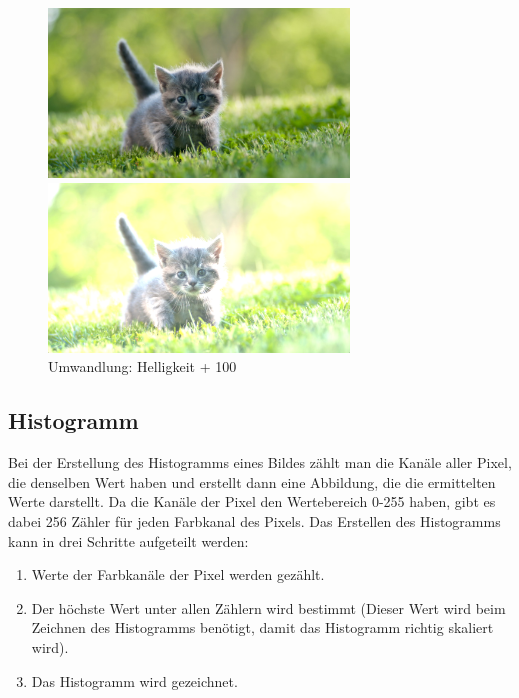 \documentclass[11pt]{amsart}
\begin{document}
\newpage
\begin{figure}[thb!]
\begin{minipage}{8cm}
\includegraphics[width=8cm]{images/original.jpg}
\end{minipage}
\qquad
\begin{minipage}{8cm}
\includegraphics[width=8cm]{images/myHelligkeit.png}
\end{minipage}
\caption{Umwandlung: Helligkeit + 100}
\label{fig:hellExample}
\end{figure}



\subsection{Histogramm}
Bei der Erstellung des Histogramms eines Bildes zählt man die Kanäle aller Pixel, die denselben Wert haben und erstellt dann eine Abbildung, die die ermittelten Werte darstellt. Da die Kanäle der Pixel den Wertebereich 0-255 haben, gibt es dabei 256 Zähler für jeden Farbkanal des Pixels. Das Erstellen des Histogramms kann in drei Schritte aufgeteilt werden:

\begin{enumerate}
\item Werte der Farbkanäle der Pixel werden gezählt.
\item Der höchste Wert unter allen Zählern wird bestimmt (Dieser Wert wird beim Zeichnen des Histogramms benötigt, damit das Histogramm richtig skaliert wird).
\item Das Histogramm wird gezeichnet.
\end{enumerate}
\end{document}
